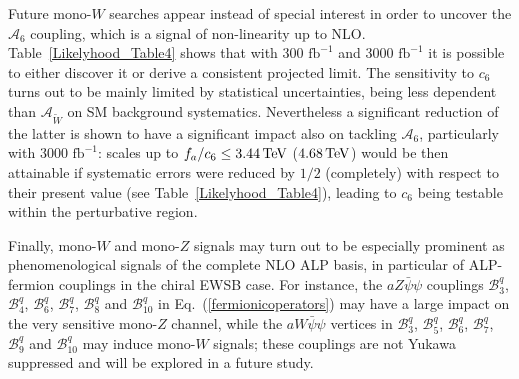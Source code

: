 \documentclass[11pt]{article}
\newcommand{\B}{\mathcal{B}}
\renewcommand{\[}{\begin{equation}}
\renewcommand{\]}{\end{equation}}
\begin{document}
Future mono-$W$ searches appear instead of special interest in order to uncover the $\mathcal{A}_{6}$ coupling, which is a signal of non-linearity  up to NLO. 
Table~\ref{Likelyhood_Table4} shows that with 300 $\mathrm{fb}^{-1}$ and 3000 $\mathrm{fb}^{-1}$ it is possible to either discover it or derive a consistent 
projected limit. The sensitivity to $c_6$ turns out to be mainly limited by statistical uncertainties, being 
less dependent than $\mathcal{A}_{\tilde{W}}$ on SM background systematics. Nevertheless a significant reduction of the latter is shown to have a 
significant impact also on tackling $\mathcal{A}_6$, particularly with 3000 $\mathrm{fb}^{-1}$:  scales up to $f_a/c_6 \le \unit[3.44]{TeV}$ ($\unit[4.68]{TeV}$) 
would be then attainable if systematic errors were reduced by $1/2$ (completely) with respect to their present value (see Table~\ref{Likelyhood_Table4}), 
leading to $c_6$ being testable within the perturbative region. 

Finally, mono-$W$ and mono-$Z$ signals may turn out to be especially prominent as phenomenological signals of the complete NLO ALP basis, 
in particular of ALP-fermion couplings
in the chiral EWSB case.  For instance, the $aZ\bar{\psi}\psi$ couplings   $\B^q_3$, $\B^q_4$, $\B^q_6$, $\B^q_7$, $\B^q_8$ and $\B^q_{10}$ 
in Eq.~(\ref{fermionicoperators}) may have a large impact on the very sensitive mono-$Z$ channel, while  the $aW\bar{\psi}\psi$ 
vertices in $\B^q_3$, $\B^q_5$, $\B^q_6$, $\B^q_7$, $\B^q_9$ and $\B^q_{10}$ may induce mono-$W$ signals; these couplings are not Yukawa 
suppressed and will be explored in a future study.
\end{document}
